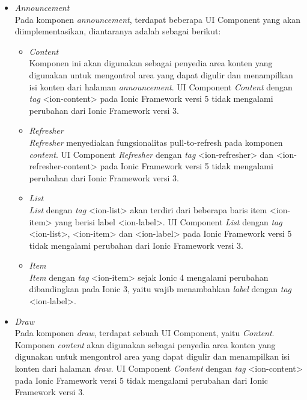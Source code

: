 \begin{itemize}
	\item \textit{Announcement} \\
	Pada komponen \textit{announcement}, terdapat beberapa UI Component yang akan diimplementasikan, diantaranya adalah sebagai berikut:
	\begin{itemize}
		\item \textit{Content} \\
		Komponen ini akan digunakan sebagai penyedia area konten yang digunakan untuk mengontrol area yang dapat digulir dan menampilkan isi konten dari halaman \textit{announcement}. UI Component \textit{Content} dengan \textit{tag} <ion-content> pada Ionic Framework versi 5 tidak mengalami perubahan dari Ionic Framework versi 3. 
		
		\item \textit{Refresher} \\
		\textit{Refresher} menyediakan fungsionalitas  pull-to-refresh pada komponen \textit{content}. UI Component \textit{Refresher} dengan \textit{tag} <ion-refresher> dan <ion-refresher-content> pada Ionic Framework versi 5 tidak mengalami perubahan dari Ionic Framework versi 3.

		\item \textit{List} \\
		\textit{List} dengan \textit{tag} <ion-list> akan terdiri dari beberapa baris item <ion-item> yang berisi label <ion-label>. UI Component \textit{List} dengan \textit{tag} <ion-list>, <ion-item> dan <ion-label> pada Ionic Framework versi 5 tidak mengalami perubahan dari Ionic Framework versi 3.
		
		\item \textit{Item} \\
		\textit{Item} dengan \textit{tag} <ion-item> sejak Ionic 4 mengalami perubahan dibandingkan pada Ionic 3, yaitu wajib menambahkan \textit{label} dengan \textit{tag} <ion-label>. 
		
	\end{itemize}
	
	\item \textit{Draw} \\
	Pada komponen \textit{draw}, terdapat sebuah UI Component, yaitu \textit{Content}. Komponen \textit{content} akan digunakan sebagai penyedia area konten yang digunakan untuk mengontrol area yang dapat digulir dan menampilkan isi konten dari halaman \textit{draw}. UI Component \textit{Content} dengan \textit{tag} <ion-content> pada Ionic Framework versi 5 tidak mengalami perubahan dari Ionic Framework versi 3. 
		

\end{itemize}
